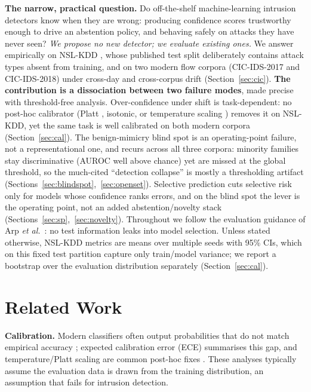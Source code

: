 \documentclass[conference,a4paper]{IEEEtran}
\begin{document}
\textbf{The narrow, practical question.} Do off-the-shelf machine-learning intrusion detectors know
when they are wrong: producing confidence scores trustworthy enough to drive an abstention policy, and
behaving safely on attacks they have never seen? \emph{We propose no new detector; we evaluate existing
ones.} We answer empirically on NSL-KDD \cite{tavallaee2009nsl}, whose published test split deliberately
contains attack types absent from training, and on two modern flow corpora (CIC-IDS-2017 and
CIC-IDS-2018) under cross-day and cross-corpus drift (Section~\ref{sec:cic}). \textbf{The contribution is a
dissociation between two failure modes}, made precise with threshold-free analysis. Over-confidence under
shift is task-dependent: no post-hoc calibrator (Platt \cite{platt1999probabilistic}, isotonic, or
temperature scaling \cite{guo2017calibration}) removes it on NSL-KDD, yet the same task is well calibrated
on both modern corpora (Section~\ref{sec:cal}). The benign-mimicry blind spot is an operating-point
failure, not a representational one, and recurs across all three corpora: minority families stay
discriminative (AUROC well above chance) yet are missed at the global threshold, so the much-cited
``detection collapse'' is mostly a thresholding artifact (Sections~\ref{sec:blindspot},~\ref{sec:openset}).
Selective prediction \cite{elyaniv2010selective,geifman2017selective} cuts selective risk only for models
whose confidence ranks errors, and on the blind spot the lever is the operating point, not an added
abstention/novelty stack (Sections~\ref{sec:sp},~\ref{sec:novelty}).
Throughout we
follow the evaluation guidance of Arp \emph{et al.}~\cite{arp2022dodos}: no test information leaks into
model selection. Unless stated otherwise,
NSL-KDD metrics are means over multiple seeds with 95\% CIs, which on this fixed test partition capture
only train/model variance; we report a bootstrap over the evaluation distribution separately
(Section~\ref{sec:cal}).

\section{Related Work}
\textbf{Calibration.} Modern classifiers often output probabilities that do not match empirical
accuracy \cite{guo2017calibration,niculescu2005predicting}; expected calibration error (ECE) summarises
this gap, and temperature/Platt scaling are common post-hoc fixes \cite{platt1999probabilistic}. These
analyses typically assume the evaluation data is drawn from the training distribution, an assumption
that fails for intrusion detection.
\end{document}
